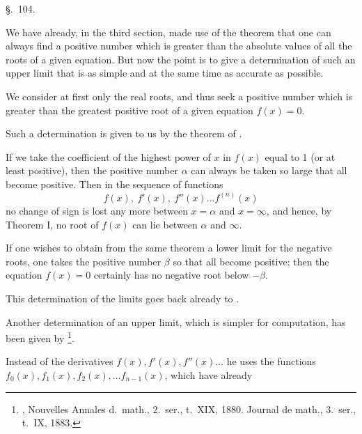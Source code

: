 
\begin{center}
\S.\ 104.

\end{center}

We have already, in the third section, made use of the theorem that
one can always find a positive number which is greater than the
absolute values of all the roots of a given equation. But now the
point is to give a determination of such an upper limit that is as
simple and at the same time as accurate as possible.

We consider at first only the real roots, and thus seek a positive
number which is greater than the greatest positive root of a given
equation $f(x)=0$.

Such a determination is given to us by the theorem of .

If we take the coefficient of the highest power of $x$ in $f(x)$
equal to 1 (or at least positive), then the positive number
$\alpha$ can always be taken so large that
all become positive. Then in the sequence of functions
\[
f(x),\ f'(x),\ f''(x)\ldots f^{(n)}(x)
\]
no change of sign is lost any more between $x=\alpha$ and $x=\infty$, and
hence, by Theorem I, no root of $f(x)$ can lie between
$\alpha$ and $\infty$.

If one wishes to obtain from the same theorem a lower limit for the
negative roots, one takes the positive number $\beta$ so that
all become positive; then the equation $f(x)=0$ certainly has no
negative root below $-\beta$.

This determination of the limits goes back already to .

Another determination of an upper limit, which is simpler for
computation, has been given by \footnote{,
Nouvelles Annales d.\ math., 2.\ ser., t.\ XIX, 1880. Journal de math.,
3.\ ser., t.\ IX, 1883.}.

Instead of the derivatives $f(x), f'(x), f''(x)\ldots$ he uses the
functions $f_0(x), f_1(x), f_2(x), \ldots f_{n-1}(x)$, which have already
